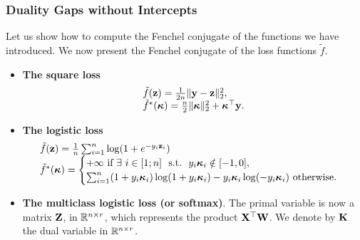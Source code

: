 \documentclass[a4paper, 11pt]{article}
\begin{document}
                                         \subsubsection{Duality Gaps without Intercepts}
                                         Let us show how to compute the Fenchel conjugate of the functions we have introduced.
                                         We now present the Fenchel conjugate of the loss functions $\tilde{f}$.
                                         \begin{itemize}
                                         \item \textbf{The square loss}
                                         $$\begin{array}{l}
                                         \tilde{f}(\z)=\frac{1}{2n}\|\y-\z\|_2^2, \\
                                            \tilde{f}^\ast(\kappab)=\frac{n}{2}\|\kappab\|_2^2 + \kappab^\top\y.
                                            \end{array}
                                            $$
                                            \item \textbf{The logistic loss}
                                            $$\begin{array}{l}
                                            \tilde{f}(\z)=\frac{1}{n}\sum_{i=1}^n \log(1+e^{-y_i\z_i}) \\
                                               \tilde{f}^\ast(\kappab)=\begin{cases}
                                               +\infty ~\text{if}~ \exists~i\in \InSet{n} \st y_i\kappab_i \notin [-1,0],\\
                                                  \sum_{i=1}^n(1+y_i\kappab_i)\log(1+y_i\kappab_i)-y_i\kappab_i\log(-y_i\kappab_i) ~\text{otherwise}.
                                                  \end{cases}
                                                  \end{array}
                                                  $$
                                                  \item \textbf{The multiclass logistic loss (or softmax)}. The primal variable is now a matrix $\Z$, in $\Real^{n \times r}$, which represents the product $\X^\top \W$. We denote by $\K$ the dual variable in $\Real^{n \times r}$.
                                                  $$\begin{array}{l}

\end{array}$$
\end{itemize}
\end{document}
